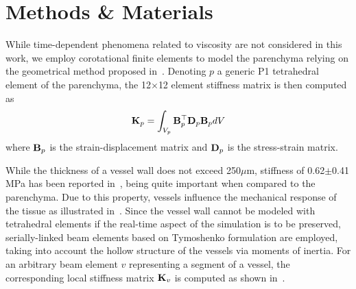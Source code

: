 \section{Methods \& Materials}
\label{sec:methodology}
\vspace{-6pt}


While time-dependent phenomena related to viscosity are not considered in this work, we employ corotational finite elements to model the parenchyma
relying on the geometrical method proposed in~\cite{Nesme2005}.
Denoting $p$ a generic P1 tetrahedral element of the parenchyma, the 12$\times$12 element stiffness matrix is then computed as
\begin{equation}
\mathbf{K}_p = \int_{V_p} \mathbf{B}_p^\top \mathbf{D}_p \mathbf{B}_p dV
\end{equation}
where $\mathbf{B}_p$ is the strain-displacement matrix and $\mathbf{D}_p$ is the stress-strain matrix.

While the thickness of a vessel wall does not exceed 250$\mu$m,%
stiffness of 0.62$\pm$0.41\,MPa has been reported 
in~\cite{Umale2011}, being quite important when compared to the parenchyma. Due to this property, vessels influence 
the mechanical response of the tissue as illustrated in~\cite{Peterlik2012}. Since the vessel wall cannot be modeled 
with tetrahedral elements if the real-time aspect of the simulation is to be preserved, 
serially-linked beam elements based on Tymoshenko formulation are employed, taking into account the hollow 
structure of the vessels via moments of inertia. 
For an arbitrary beam element $v$ representing a segment of a vessel, the corresponding local stiffness matrix $\mathbf{K}_v$ is computed as shown in~\cite{Duriez2006}.

